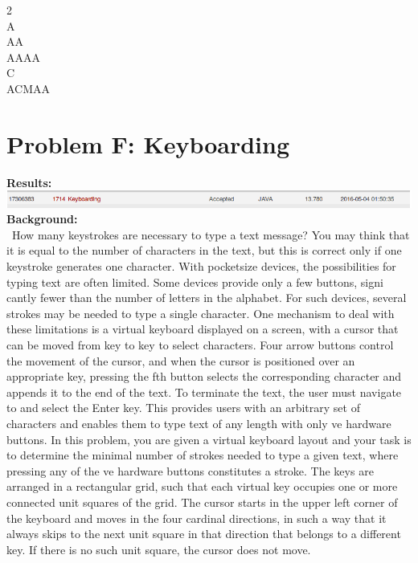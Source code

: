\documentclass[12pt]{article}
\begin{document}
 2 \\
A       \\
AA      \\
AAAA    \\
C       \\
ACMAA
\newpage










\section{Problem F: Keyboarding}
\noindent \textbf{Results:} \\

\includegraphics[width=\textwidth]{ProblemF} \\

\noindent \textbf{Background:} \\
~\indent How many keystrokes are necessary to type a text message? You may think that it is equal to the
number of characters in the text, but this is correct only if one keystroke generates one character.
With pocketsize devices, the possibilities for typing text are often limited. Some devices provide only
a few buttons, signi cantly fewer than the number of letters in the alphabet. For such devices, several
strokes may be needed to type a single character. One mechanism to deal with these limitations is
a virtual keyboard displayed on a screen, with a cursor that can be moved from key to key to select
characters. Four arrow buttons control the movement of the cursor, and when the cursor is positioned
over an appropriate key, pressing the  fth button selects the corresponding character and appends it
to the end of the text. To terminate the text, the user must navigate to and select the Enter key. This
provides users with an arbitrary set of characters and enables them to type text of any length with
only  ve hardware buttons. In this problem, you are given a virtual keyboard layout and your task
is to determine the minimal number of strokes needed to type a given text, where pressing any of the
ve hardware buttons constitutes a stroke. The keys are arranged in a rectangular grid, such that each
virtual key occupies one or more connected unit squares of the grid. The cursor starts in the upper left
corner of the keyboard and moves in the four cardinal directions, in such a way that it always skips to
the next unit square in that direction that belongs to a different key. If there is no such unit square,
the cursor does not move. \\
\end{document}
